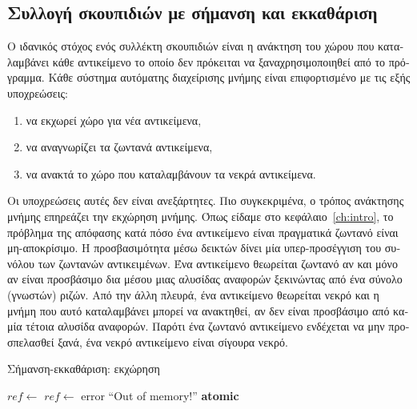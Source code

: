 \begin{greek}
\chapter{Συλλογή σκουπιδιών με σήμανση και εκκαθάριση}\label{ch:mrkswp}

Ο ιδανικός στόχος ενός συλλέκτη σκουπιδιών είναι η ανάκτηση
του χώρου που καταλαμβάνει κάθε αντικείμενο το οποίο δεν
πρόκειται να ξαναχρησιμοποιηθεί από το πρόγραμμα. Κάθε
σύστημα αυτόματης διαχείρισης μνήμης είναι επιφορτισμένο με
τις εξής υποχρεώσεις:

\begin{enumerate}
  \item να εκχωρεί χώρο για νέα αντικείμενα,
  \item να αναγνωρίζει τα ζωντανά αντικείμενα,
  \item να ανακτά το χώρο που καταλαμβάνουν τα νεκρά αντικείμενα.
\end{enumerate}

Οι υποχρεώσεις αυτές δεν είναι ανεξάρτητες. Πιο συγκεκριμένα,
ο τρόπος ανάκτησης μνήμης επηρεάζει την εκχώρηση μνήμης. Όπως
είδαμε στο κεφάλαιο~\ref{ch:intro}, το πρόβλημα της απόφασης
κατά πόσο ένα αντικείμενο είναι πραγματικά ζωντανό είναι
μη-αποκρίσιμο. Η προσβασιμότητα μέσω δεικτών δίνει μία
υπερ-προσέγγιση του συνόλου των ζωντανών αντικειμένων. Ένα
αντικείμενο θεωρείται ζωντανό αν και μόνο αν είναι προσβάσιμο
δια μέσου μιας αλυσίδας αναφορών ξεκινώντας από ένα σύνολο
(γνωστών) ριζών. Από την άλλη πλευρά, ένα αντικείμενο θεωρείται
νεκρό και η μνήμη που αυτό καταλαμβάνει μπορεί να ανακτηθεί,
αν δεν είναι προσβάσιμο από καμία τέτοια αλυσίδα αναφορών.
Παρότι ένα ζωντανό αντικείμενο ενδέχεται να μην προσπελασθεί
ξανά, ένα νεκρό αντικείμενο είναι σίγουρα νεκρό.

\begin{algorithm}
  \caption{Σήμανση-εκκαθάριση: εκχώρηση}
  \label{alg:mrkswp_1}
  \begin{algorithmic}[1]
      \State $ref \gets$ 
       
        \State {}
        \State $ref \gets$ 
          \State error ``Out of memory!''
        \EndIf
      \EndIf
      \State {}
    \EndProcedure
    \Statex
      \State \textbf{atomic}
      \State {}
      \State {}
    \EndProcedure
  \end{algorithmic}
\end{algorithm}


\end{greek}
